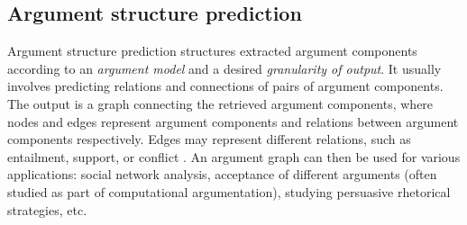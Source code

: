 

\subsection{Argument structure prediction}
\label{sec:area_arg_struc_pred}

Argument structure prediction structures extracted argument components
according to an \emph{argument model} and a desired \emph{granularity of
output}. It usually involves predicting relations and connections of pairs of
argument components. The output is a graph connecting the retrieved argument
components, where nodes and edges represent argument components and relations
between argument components respectively. Edges may represent different
relations, such as entailment, support, or conflict
\citep{lippi2016argumentation}. An argument graph can then be used
for various applications: social network analysis, acceptance of different
arguments (often studied as part of computational argumentation), studying
persuasive rhetorical strategies, etc.

